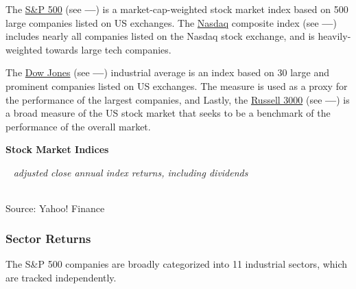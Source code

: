 \documentclass{report}
\begin{document}
{\begin{minipage}{0.76\textwidth}
\small The \href{https://us.spindices.com/indices/equity/sp-500}{S\&P 500} (see {\color{green!80!blue!90!black}\textbf{---}}) is a market-cap-weighted stock market index based on 500 large companies listed on US exchanges.  The \href{https://www.nasdaq.com/market-activity/index/comp}{Nasdaq} composite index (see {\color{blue}\textbf{---}}) includes nearly all companies listed on the Nasdaq stock exchange, and is heavily-weighted towards large tech companies. 

The \href{https://finance.yahoo.com/quote/\%5EDJI/}{Dow Jones} (see {\color{red}\textbf{---}})  industrial average is an index based on 30 large and prominent companies listed on US exchanges. The measure is used as a proxy for the performance of the largest companies, and  Lastly, the \href{https://www.ftserussell.com/products/indices/russell-us}{Russell 3000} (see {\color{violet}\textbf{---}}) is a broad measure of the US stock market that seeks to be a benchmark of the performance of the overall market. 

\normalsize \textbf{Stock Market Indices}\\
\footnotesize{\ \textit{\hspace{18mm} adjusted close \hspace{32mm} annual index returns, including dividends}
\vspace{-4mm}

 \setlength{\tabcolsep}{2.0pt} \color{black!90}
{\renewcommand{\arraystretch}{1.52}
	\begin{tabular}{p{20mm} R{12.0mm} R{12.0mm} R{10.0mm} R{10.0mm} R{10.0mm} R{10.0mm} R{10.0mm} R{10.0mm}}
		 \hline
	\end{tabular}
}}
		
\vspace{-2mm}
\footnotesize{Source: Yahoo! Finance}
\vspace{1mm}

\subsubsection*{Sector Returns}
\small The S\&P 500 companies are broadly categorized into 11 industrial sectors, which are tracked independently. 
\end{minipage}
\vspace{1mm}

}
\end{document}
